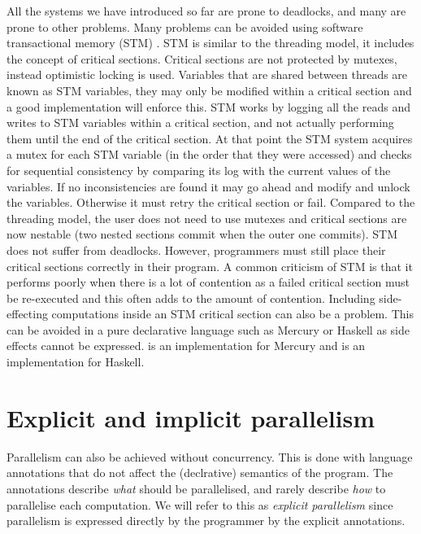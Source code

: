 All the systems we have introduced so far are prone to deadlocks,
and many are prone to other problems.
Many problems can be avoided using software transactional memory (STM)
\citep{stm}.
STM is similar to the threading model, it includes the concept of critical
sections.
Critical sections are not protected by mutexes,
instead optimistic locking is used.
Variables that are shared between threads are known as STM variables,
they may only be modified within a critical section and a good implementation
will enforce this.
STM works by logging all the reads and writes to STM variables within a
critical section, and not actually performing them until the end of the
critical section.
At that point the STM system acquires a mutex for each STM variable (in the
order that they were accessed)
and checks for sequential consistency by comparing its log with the current
values of the variables.
If no inconsistencies are found
it may go ahead and modify and unlock the variables.
Otherwise it must retry the critical section or fail.
Compared to the threading model,
the user does not need to use mutexes and critical sections are now
nestable (two nested sections commit when the outer one commits).
STM does not suffer from deadlocks.
However, programmers must still place their critical sections correctly in
their program.
A common criticism of STM is that it performs poorly when there is a lot of
contention as a failed critical section must be re-executed and this often
adds to the amount of contention.
Including side-effecting computations inside an STM critical section can also
be a problem.
This can be avoided in a pure declarative language such as
Mercury \citep{mercury_jlp} or Haskell \citep{haskell98} as side effects cannot
be expressed.
\citet{mika:mercury-stm} is an implementation for Mercury
and \citet{harris:2005:haskell-stm} is an implementation for Haskell.

\section{Explicit and implicit parallelism}
\label{sec:intro_par}

Parallelism can also be achieved without concurrency.
This is done with language annotations that do not affect the (declrative)
semantics of the program.
The annotations describe \emph{what} should be parallelised,
and rarely describe \emph{how} to parallelise each computation.
We will refer to this as \emph{explicit parallelism}
since parallelism is expressed directly by the programmer by the explicit
annotations.

